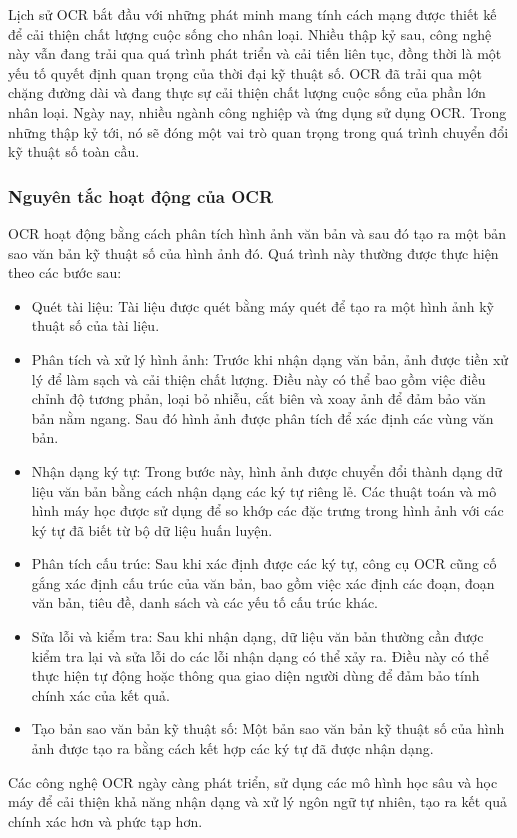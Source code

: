 Lịch sử OCR bắt đầu với những phát minh mang tính cách mạng được thiết kế để cải thiện chất lượng cuộc sống cho nhân loại. Nhiều thập kỷ sau, công nghệ này vẫn đang trải qua quá trình phát triển và cải tiến liên tục, đồng thời là một yếu tố quyết định quan trọng của thời đại kỹ thuật số. OCR đã trải qua một chặng đường dài và đang thực sự cải thiện chất lượng cuộc sống của phần lớn nhân loại. Ngày nay, nhiều ngành công nghiệp và ứng dụng sử dụng OCR. Trong những thập kỷ tới, nó sẽ đóng một vai trò quan trọng trong quá trình chuyển đổi kỹ thuật số toàn cầu.\cite{veryfi}

\subsubsection{Nguyên tắc hoạt động của OCR}
OCR hoạt động bằng cách phân tích hình ảnh văn bản và sau đó tạo ra một bản sao văn bản kỹ thuật số của hình ảnh đó. Quá trình này thường được thực hiện theo các bước sau:
\begin{itemize}
    \item Quét tài liệu: Tài liệu được quét bằng máy quét để tạo ra một hình ảnh kỹ thuật số của tài liệu.
    \item Phân tích và xử lý hình ảnh: Trước khi nhận dạng văn bản, ảnh được tiền xử lý để làm sạch và cải thiện chất lượng. Điều này có thể bao gồm việc điều chỉnh độ tương phản, loại bỏ nhiễu, cắt biên và xoay ảnh để đảm bảo văn bản nằm ngang. Sau đó hình ảnh được phân tích để xác định các vùng văn bản.
    \item Nhận dạng ký tự: Trong bước này, hình ảnh được chuyển đổi thành dạng dữ liệu văn bản bằng cách nhận dạng các ký tự riêng lẻ. Các thuật toán và mô hình máy học được sử dụng để so khớp các đặc trưng trong hình ảnh với các ký tự đã biết từ bộ dữ liệu huấn luyện.
    \item Phân tích cấu trúc: Sau khi xác định được các ký tự, công cụ OCR cũng cố gắng xác định cấu trúc của văn bản, bao gồm việc xác định các đoạn, đoạn văn bản, tiêu đề, danh sách và các yếu tố cấu trúc khác.
    \item Sửa lỗi và kiểm tra: Sau khi nhận dạng, dữ liệu văn bản thường cần được kiểm tra lại và sửa lỗi do các lỗi nhận dạng có thể xảy ra. Điều này có thể thực hiện tự động hoặc thông qua giao diện người dùng để đảm bảo tính chính xác của kết quả.
    \item Tạo bản sao văn bản kỹ thuật số: Một bản sao văn bản kỹ thuật số của hình ảnh được tạo ra bằng cách kết hợp các ký tự đã được nhận dạng.
\end{itemize}
Các công nghệ OCR ngày càng phát triển, sử dụng các mô hình học sâu và học máy để cải thiện khả năng nhận dạng và xử lý ngôn ngữ tự nhiên, tạo ra kết quả chính xác hơn và phức tạp hơn.

